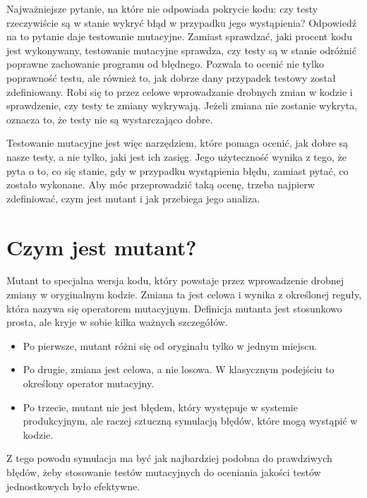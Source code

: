 \documentclass[12pt,a4paper,oldfontcommands]{memoir}
\theoremstyle{plain}
\theoremstyle{definition}
\theoremstyle{remark}
\begin{document}
    Najważniejsze pytanie, na które nie odpowiada pokrycie kodu: czy testy rzeczywiście są w stanie wykryć błąd w przypadku jego wystąpienia?
    Odpowiedź na to pytanie daje testowanie mutacyjne.
    Zamiast sprawdzać, jaki procent kodu jest wykonywany, testowanie mutacyjne sprawdza, czy testy są w stanie odróżnić poprawne zachowanie programu od błędnego.
    Pozwala to ocenić nie tylko poprawność testu, ale również to, jak dobrze dany przypadek testowy został zdefiniowany.
    Robi się to przez celowe wprowadzanie drobnych zmian w kodzie i sprawdzenie, czy testy te zmiany wykrywają.
    Jeżeli zmiana nie zostanie wykryta, oznacza to, że testy nie są wystarczająco dobre.

    Testowanie mutacyjne jest więc narzędziem, które pomaga ocenić, jak dobre są nasze testy, a nie tylko, jaki jest ich zasięg.
    Jego użyteczność wynika z tego, że pyta o to, co się stanie, gdy w przypadku wystąpienia błędu, zamiast pytać, co zostało wykonane.
    Aby móc przeprowadzić taką ocenę, trzeba najpierw zdefiniować, czym jest mutant i jak przebiega jego analiza.

    \section{Czym jest mutant?}

    Mutant to specjalna wersja kodu, który powstaje przez wprowadzenie drobnej zmiany w oryginalnym kodzie.
    Zmiana ta jest celowa i wynika z określonej reguły, która nazywa się operatorem mutacyjnym.
    Definicja mutanta jest stosunkowo prosta, ale kryje w sobie kilka ważnych szczegółów.
    \begin{itemize}
        \item Po pierwsze, mutant różni się od oryginału tylko w jednym miejscu.
        \item Po drugie, zmiana jest celowa, a nie losowa. W klasycznym podejściu to określony operator mutacyjny.
        \item Po trzecie, mutant nie jest błędem, który występuje w systemie produkcyjnym, ale raczej sztuczną symulacją błędów, które mogą wystąpić w kodzie.
    \end{itemize}
    Z tego powodu symulacja ma być jak najbardziej podobna do prawdziwych błędów, żeby stosowanie testów mutacyjnych do oceniania jakości testów jednostkowych było efektywne.
\end{document}
